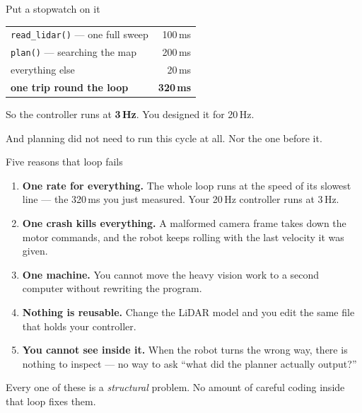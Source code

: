 \documentclass[aspectratio=169]{beamer}
\begin{document}
\begin{frame}{Put a stopwatch on it}
  \small
  \begin{center}
  \begin{tabular}{@{}p{5.2cm}r@{}}
    \toprule
    \texttt{read\_lidar()} --- one full sweep & 100\,ms \\
    \texttt{plan()} --- searching the map     & 200\,ms \\
    everything else                            & \phantom{0}20\,ms \\
    \midrule
    \textbf{one trip round the loop}           & \textbf{320\,ms} \\
    \bottomrule
  \end{tabular}
  \end{center}

  \vspace{0.7em}
  So the controller runs at \textbf{3\,Hz}. You designed it for 20\,Hz.

  \vspace{0.5em}

  \vspace{0.5em}
  \centering\footnotesize
  And planning did not need to run this cycle at all. Nor the one before it.
\end{frame}

\begin{frame}{Five reasons that loop fails}
  \small
  \begin{enumerate}
    \item \textbf{One rate for everything.} The whole loop runs at the speed of its slowest
          line --- the 320\,ms you just measured. Your 20\,Hz controller runs at 3\,Hz.
    \item \textbf{One crash kills everything.} A malformed camera frame takes down the motor
          commands, and the robot keeps rolling with the last velocity it was given.
    \item \textbf{One machine.} You cannot move the heavy vision work to a second computer
          without rewriting the program.
    \item \textbf{Nothing is reusable.} Change the LiDAR model and you edit the same file
          that holds your controller.
    \item \textbf{You cannot see inside it.} When the robot turns the wrong way, there is
          nothing to inspect --- no way to ask ``what did the planner actually output?''
  \end{enumerate}

  \vspace{0.5em}
  \centering \small Every one of these is a \emph{structural} problem. No amount of careful
  coding inside that loop fixes them.
\end{frame}
\end{document}
